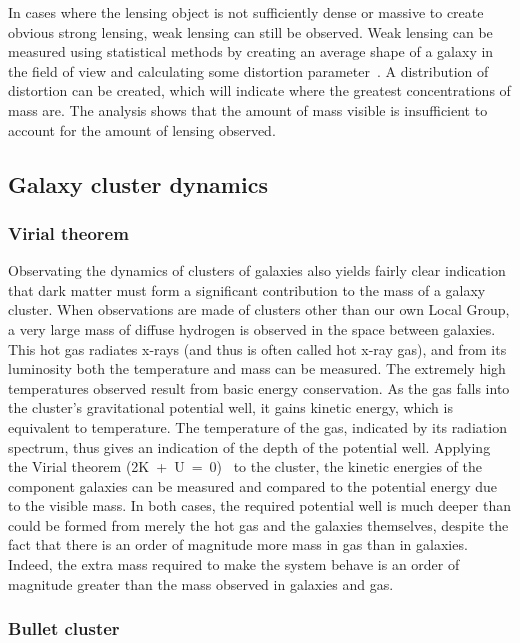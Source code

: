 In cases where the lensing object is not sufficiently dense or massive to create obvious strong lensing, weak lensing can still be observed. Weak lensing can be measured using statistical methods by creating an average shape of a galaxy in the field of view and calculating some distortion parameter~\cite{Bartelmann:1999yn}. A distribution of distortion can be created, which will indicate where the greatest concentrations of mass are. The analysis shows that the amount of mass visible is insufficient to account for the amount of lensing observed.

\subsection{Galaxy cluster dynamics}

\subsubsection{Virial theorem}

Observating the dynamics of clusters of galaxies also yields fairly clear indication that dark matter must form a significant contribution to the mass of a galaxy cluster. When observations are made of clusters other than our own Local Group, a very large mass of diffuse hydrogen is observed in the space between galaxies. This hot gas radiates x-rays (and thus is often called hot x-ray gas), and from its luminosity both the temperature and mass can be measured. The extremely high temperatures observed result from basic energy conservation. As the gas falls into the cluster's gravitational potential well, it gains kinetic energy, which is equivalent to temperature. The temperature of the gas, indicated by its radiation spectrum, thus gives an indication of the depth of the potential well. Applying the Virial theorem (2K~+~U~=~0)~\cite{Claussius:1870} to the cluster, the kinetic energies of the component galaxies can be measured and compared to the potential energy due to the visible mass. In both cases, the required potential well is much deeper than could be formed from merely the hot gas and the galaxies themselves, despite the fact that there is an order of magnitude more mass in gas than in galaxies. Indeed, the extra mass required to make the system behave is an order of magnitude greater than the mass observed in galaxies and gas.

\subsubsection{Bullet cluster}

